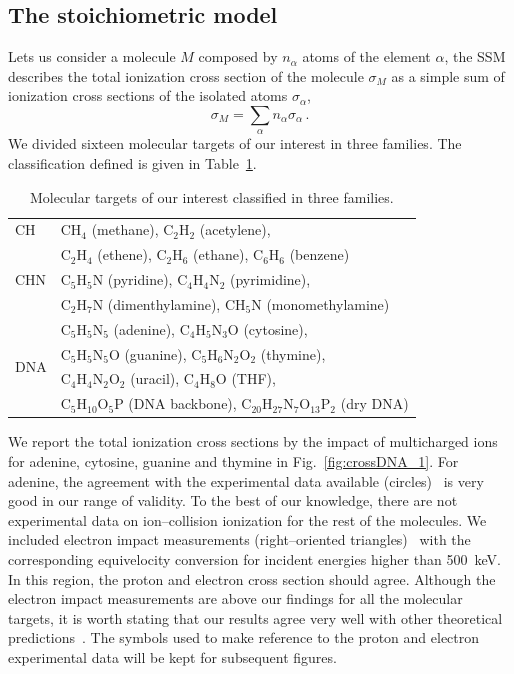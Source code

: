\documentclass[preprint,12pt]{article}
\begin{document}
\subsection{The stoichiometric model}

Lets us consider a molecule $M$ composed by $n_{\alpha}$ atoms of the
element $\alpha$, the SSM describes the total ionization cross section 
of the molecule $\sigma_{M}$ as a simple sum of ionization cross 
sections of the isolated atoms $\sigma_{\alpha}$, 
\begin{equation}
 \sigma_{M}=\sum\limits_{\alpha}n_{\alpha}\sigma_{\alpha}\,.  
 \label{eq:sumion}
\end{equation}
We divided sixteen molecular targets of our interest in three families. 
The classification defined is given in Table~\ref{tab:families}.

\begin{table}[H]
\begin{center}
\begin{tabular}{|p{}|p{}|}
\hline
 CH  & CH$_4$ (methane), C$_2$H$_2$ (acetylene), \\
     & C$_2$H$_4$ (ethene), C$_2$H$_6$ (ethane), C$_6$H$_6$ (benzene) \\
\hline
 CHN & C$_5$H$_5$N (pyridine), C$_4$H$_4$N$_2$ (pyrimidine), \\
& C$_2$H$_7$N 
(dimenthylamine), CH$_5$N (monomethylamine) \\
\hline
 \multirow{4}{*}{DNA} 
     & C$_5$H$_5$N$_5$ (adenine), C$_4$H$_5$N$_3$O (cytosine), \\
     & C$_5$H$_5$N$_5$O (guanine), C$_5$H$_6$N$_2$O$_2$ (thymine), \\
     & C$_4$H$_4$N$_2$O$_2$ (uracil), C$_4$H$_8$O (THF), \\
     & C$_5$H$_{10}$O$_5$P (DNA backbone), C$_{20}$H$_{27}$N$_7$O$_{13}$P$_2$ (dry DNA) \\
\hline
\end{tabular}
\caption{Molecular targets of our interest classified in three families.}
\label{tab:families}
\end{center}
\end{table}

We report the total ionization cross sections by the impact of 
multicharged ions for adenine, cytosine, guanine and thymine in 
Fig.~\ref{fig:crossDNA_1}. For adenine, the agreement with the 
experimental data available (circles)~\cite{iriki2011} is very good 
in our range of validity. To the best of our knowledge, there are not 
experimental data on ion--collision ionization for the rest of the 
molecules. We included electron impact measurements (right--oriented 
triangles)~\cite{rahman2016} with the corresponding equivelocity 
conversion for incident energies higher than 500~keV. In this region, 
the proton and electron cross section should agree. Although the electron 
impact measurements are above our findings for all the molecular targets, 
it is worth stating that our results agree very well with other 
theoretical predictions~\cite{mozejko2003,tan2018}. The symbols used to 
make reference to the proton and electron experimental data will be kept 
for subsequent figures.
\end{document}
